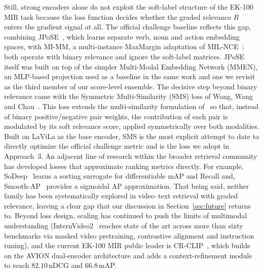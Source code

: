 Still, strong encoders alone do not exploit the soft-label structure of the EK-100 MIR task because the loss function decides whether the graded relevance $R$ enters the gradient signal at all. The official challenge baseline reflects this gap, combining JPoSE~\cite{wray2019jpose}, which learns separate verb, noun and action embedding spaces, with MI-MM, a multi-instance MaxMargin adaptation of MIL-NCE~\cite{miech2020milnce}; both operate with binary relevance and ignore the soft-label matrices. JPoSE itself was built on top of the simpler Multi-Modal Embedding Network (MMEN), an MLP-based projection used as a baseline in the same work and one we revisit as the third member of our score-level ensemble. The decisive step beyond binary relevance came with the Symmetric Multi-Similarity (SMS) loss of Wang, Wang and Chau~\cite{wang2024symmetricmultisimilaritylossepickitchens100}. This loss extends the multi-similarity formulation of~\cite{wang2019multisimilarity} so that, instead of binary positive/negative pair weights, the contribution of each pair is modulated by its soft relevance score, applied symmetrically over both modalities. Built on LaViLa as the base encoder, SMS is the most explicit attempt to date to directly optimize the official challenge metric and is the loss we adopt in Approach~3. An adjacent line of research within the broader retrieval community has developed losses that approximate ranking metrics directly. For example, SoDeep~\cite{engilberge2019sodeep} learns a sorting surrogate for differentiable mAP and Recall and, Smooth-AP~\cite{brown2020smoothap} provides a sigmoidal AP approximation. That being said, neither family has been systematically explored in video--text retrieval with graded relevance, leaving a clear gap that our discussion in Section~\ref{sec:future} returns to. Beyond loss design, scaling has continued to push the limits of multimodal understanding (InternVideo2~\cite{wang2024internvideo2} reaches state of the art across more than sixty benchmarks via masked video pretraining, contrastive alignment and instruction tuning), and the current EK-100 MIR public leader is CR-CLIP~\cite{he2025crclip}, which builds on the AVION dual-encoder architecture and adds a context-refinement module to reach $82.10$\,nDCG and $66.8$\,mAP.

